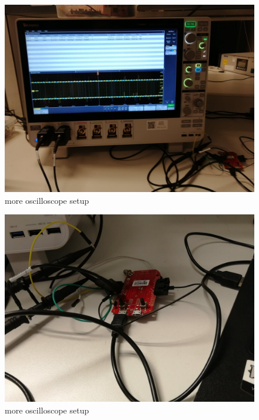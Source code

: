 \documentclass{beamer}
\begin{document}
\begin{frame}

\begin{figure}
\centering
\includegraphics[scale=0.1]{assets/2.jpg}
\caption{more oscilloscope setup}
\end{figure}

\end{frame}


\begin{frame}

\begin{figure}
\centering
\includegraphics[scale=0.1]{assets/3.jpg}
\caption{more oscilloscope setup}
\end{figure}

\end{frame}

\end{document}
